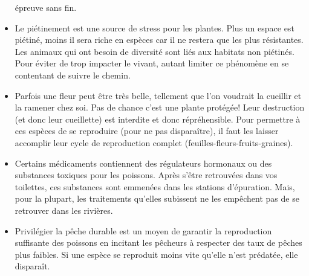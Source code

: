 \begin{itemize}
  épreuve sans fin.\\
\item
  Le piétinement est une source de stress pour les plantes. Plus un
  espace est piétiné, moins il sera riche en espèces car il ne restera
  que les plus résistantes. Les animaux qui ont besoin de diversité sont
  liés aux habitats non piétinés. Pour éviter de trop impacter le
  vivant, autant limiter ce phénomène en se contentant de suivre le
  chemin.\\
\item
  Parfois une fleur peut être très belle, tellement que l'on voudrait la
  cueillir et la ramener chez soi. Pas de chance c'est une plante
  protégée! Leur destruction (et donc leur cueillette) est interdite et
  donc répréhensible. Pour permettre à ces espèces de se reproduire
  (pour ne pas disparaître), il faut les laisser accomplir leur cycle de
  reproduction complet (feuilles-fleurs-fruits-graines).\\
\item
  Certains médicaments contiennent des régulateurs hormonaux ou des
  substances toxiques pour les poissons. Après s'être retrouvées dans
  vos toilettes, ces substances sont emmenées dans les stations
  d'épuration. Mais, pour la plupart, les traitements qu'elles subissent
  ne les empêchent pas de se retrouver dans les rivières.\\
\item
  Privilégier la pêche durable est un moyen de garantir la reproduction
  suffisante des poissons en incitant les pêcheurs à respecter des taux
  de pêches plus faibles. Si une espèce se reproduit moins vite qu'elle
  n'est prédatée, elle disparaît.
\end{itemize}
